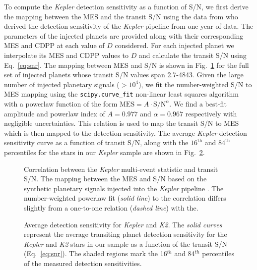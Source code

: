 \documentclass[twocolumn]{emulateapj}
\newcommand{\kepler}[1]{\emph{Kepler}#1}
\newcommand{\ktwo}[1]{\emph{K2}#1}
\begin{document}
To compute the \kepler{} detection sensitivity as a function of S/N, we first
derive the mapping between the MES and the transit S/N using the data from \cite{christiansen15} who
derived the detection sensitivity of the \kepler{} pipeline from one year of data. 
The parameters of the injected planets are provided along with their corresponding MES and CDPP at each value of
$D$ considered. For each injected planet we interpolate its MES and CDPP values to $D$ and calculate
the transit S/N using Eq.~\ref{eq:snr}. The mapping between MES and S/N is shown in Fig.~\ref{fig:messnr}
for the full set of injected planets whose transit S/N values span 2.7-4843. Given the large number of injected planetary
signals ($>10^4$), we fit the number-weighted S/N to MES mapping using the \texttt{scipy.curve\_fit} non-linear least
squares algorithm with a powerlaw function of the form $\text{MES} = A\cdot \text{S/N}^{\alpha}$. We find a best-fit
amplitude and powerlaw index of $A=0.977$ and $\alpha=0.967$ respectively with negligible uncertainties.
This relation is used to map the transit S/N to MES
which is then mapped to the detection sensitivity. The average \kepler{} detection sensitivity curve as a function of
transit S/N, along with the $16^{\text{th}}$ and $84^{\text{th}}$ percentiles for the stars in our \kepler{} sample
are shown in Fig.~\ref{fig:senscurves}.


\begin{figure}
  \centering
  \caption{Correlation between the \kepler{} multi-event statistic and transit S/N. The mapping between the MES and
    S/N based on the synthetic planetary signals injected into the \kepler{} pipeline \citep{christiansen15}.
    The number-weighted powerlaw fit (\emph{solid line}) to the correlation differs slightly from a one-to-one relation
    (\emph{dashed line}) with the.}  
  \label{fig:messnr}
\end{figure}


\begin{figure}
  \centering
  \caption{Average detection sensitivity for \kepler{} and \ktwo{.} The \emph{solid curves} represent the
    average transiting planet detection sensitivity for the \kepler{} and \ktwo{} stars in our sample as
    a function of the transit S/N (Eq.~\ref{eq:snr}). The shaded regions mark the 16$^{th}$ and 84$^{th}$
    percentiles of the measured detection sensitivities.} 
  \label{fig:senscurves}
\end{figure}
\end{document}
